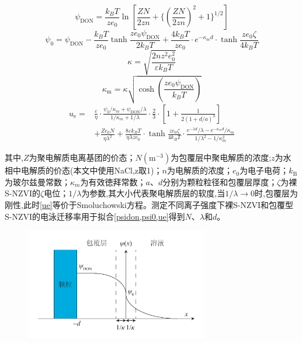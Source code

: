 \begin{equation}\label{psidon}
    \psi _\mathrm{DON}=\frac{k_BT}{ze_0}\ln[\frac{ZN}{2zn}+\{(\frac{ZN}{2zn})^2+1\}^{1/2}]
\end{equation}
\begin{equation}\label{psi0}
    \psi_0=\psi_\mathrm{DON}-\frac{k_BT}{ze_0}\tanh\frac{ze_0\psi_\mathrm{DON}}{2k_BT}+\frac{4k_BT}{ze_0}\cdot e^{-\kappa_md}\cdot\tanh\frac{ze_0\zeta }{4k_BT}
\end{equation}
\begin{equation}
    \kappa=\sqrt{\frac{2nz^2e_0^2}{\varepsilon k_B T}}
\end{equation}
\begin{equation}
    \kappa_\mathrm{m}=\kappa\sqrt{\cosh(\frac{ze_0\psi_\mathrm{DON}}{k_BT})}
\end{equation}
\begin{align}\label{ue}
    u_\mathrm{e}=&\frac{\varepsilon}{\eta }\cdot\frac{\psi _0/\kappa _m+\psi _\mathrm{DON}/\lambda }{1/\kappa _m+1/\lambda }\cdot\frac{2}{3}\cdot[1+\frac{1}{2(1+d/a)^3}]\\ &+\frac{Ze_0N}{\eta \lambda ^2}+\frac{8\varepsilon k_BT}{\eta \lambda ze_0}\cdot\tanh \frac{ze_0\zeta}{4k_BT}\cdot\frac{e^{-\lambda d}/\lambda -e^{-\kappa _md}/\kappa _m}{1/\lambda ^2-1/\kappa _m^2}\nonumber
\end{align}

其中,$Z$为聚电解质电离基团的价态；$N(\mathrm{m^{-3}})$为包覆层中聚电解质的浓度;$z$为水相中电解质的价态(本文中使用NaCl,z取1)；$n$为电解质的浓度；$e_0$为电子电荷；$k_\mathrm{B}$为玻尔兹曼常数；$\kappa_m$为有效徳拜常数；$a$、$d$分别为颗粒粒径和包覆层厚度；$\zeta$为裸S-NZVI的$\zeta$电位；$1/\lambda$为参数,其大小代表聚电解质层的软度,当$1/\lambda\rightarrow 0$时,包覆层为刚性,此时\cref{ue}等价于Smoluchowski方程。测定不同离子强度下裸S-NZVI和包覆型S-NZVI的电泳迁移率用于拟合\cref{psidon,psi0,ue}得到$N$、$\lambda$和$d$。

\begin{figure}
    \centering
    \includegraphics[width=8cm]{figs/Donnan-potential.pdf}
    \label{donnan}
\end{figure}

